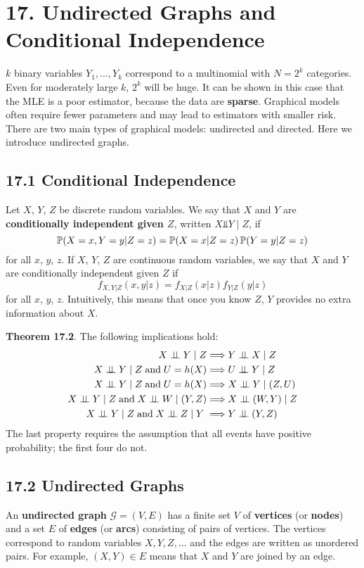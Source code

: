\section*{17. Undirected Graphs and Conditional Independence}\label{undirected-graphs-and-conditional-independence}
\(k\) binary variables \(Y_{1}, \dots, Y_{k}\) correspond to a multinomial
with \(N = 2^{k}\) categories. Even for moderately large \(k\), \(2^{k}\)
will be huge. It can be shown in this case that the MLE is a poor
estimator, because the data are \textbf{sparse}.
Graphical models often require fewer parameters and may lead to
estimators with smaller risk. There are two main types of graphical
models: undirected and directed. Here we introduce undirected graphs.


\subsection*{17.1 Conditional Independence}\label{conditional-independence}
Let \(X\), \(Y\), \(Z\) be discrete random variables. We say that \(X\)
and \(Y\) are \textbf{conditionally independent given \(Z\)}, written
\(X \text{⫫} Y \;|\; Z\), if
\[
\operatorname{\mathbb{P}}(X = x, Y = y | Z = z) = \operatorname{\mathbb{P}}(X = x | Z = z) \operatorname{\mathbb{P}}(Y = y | Z = z)
\]
for all \(x\), \(y\), \(z\). If \(X\), \(Y\), \(Z\) are continuous
random variables, we say that \(X\) and \(Y\) are conditionally
independent given \(Z\) if
\[
f_{X, Y | Z}(x, y | z) = f_{X | Z}(x | z) f_{Y | Z}(y | z)
\]
for all \(x\), \(y\), \(z\).
Intuitively, this means that once you know \(Z\), \(Y\) provides no
extra information about \(X\).

\textbf{Theorem 17.2}. The following implications hold:
\begin{align*}
X \ci Y \;|\; Z & \Longrightarrow Y \ci X \;|\; Z \\
X \ci Y \;|\; Z \; \text{and} \; U = h(X) & \Longrightarrow U \ci Y \;|\; Z \\
X \ci Y \;|\; Z \; \text{and} \; U = h(X) & \Longrightarrow X \ci Y \;|\; (Z, U)  \\
X \ci Y \;|\; Z \; \text{and} \; X \ci W \;|\; (Y, Z) & \Longrightarrow X \ci (W, Y) \;|\; Z \\
X \ci Y \;|\; Z \; \text{and} \; X \ci Z \;|\; Y \; & \Longrightarrow Y \ci (Y, Z)
\end{align*}
The last property requires the assumption that all events have positive
probability; the first four do not.


\subsection*{17.2 Undirected Graphs}\label{undirected-graphs}
An \textbf{undirected graph} \(\mathcal{G} = (V, E)\) has a finite set
\(V\) of \textbf{vertices} (or \textbf{nodes}) and a set \(E\) of
\textbf{edges} (or \textbf{arcs}) consisting of pairs of vertices. The
vertices correspond to random variables \(X, Y, Z, \dots\) and the edges
are written as unordered pairs. For example, \((X, Y) \in E\) means that
\(X\) and \(Y\) are joined by an edge.

